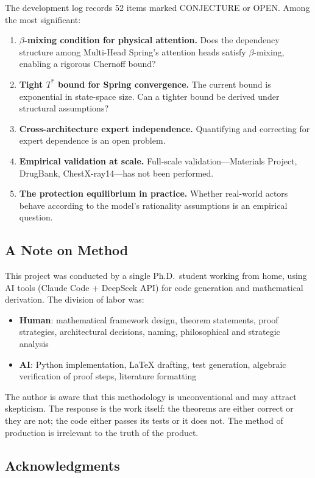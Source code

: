 \documentclass[12pt,a4paper]{ctexart}
\begin{document}
The development log records 52 items marked CONJECTURE or OPEN. Among the most significant:
\begin{enumerate}
\item \textbf{$\beta$-mixing condition for physical attention.} Does the dependency structure among Multi-Head Spring's attention heads satisfy $\beta$-mixing, enabling a rigorous Chernoff bound?
\item \textbf{Tight $T^*$ bound for Spring convergence.} The current bound is exponential in state-space size. Can a tighter bound be derived under structural assumptions?
\item \textbf{Cross-architecture expert independence.} Quantifying and correcting for expert dependence is an open problem.
\item \textbf{Empirical validation at scale.} Full-scale validation—Materials Project, DrugBank, ChestX-ray14—has not been performed.
\item \textbf{The protection equilibrium in practice.} Whether real-world actors behave according to the model's rationality assumptions is an empirical question.
\end{enumerate}

\subsection*{A Note on Method}

This project was conducted by a single Ph.D.\ student working from home, using AI tools (Claude Code + DeepSeek API) for code generation and mathematical derivation. The division of labor was:
\begin{itemize}
\item \textbf{Human}: mathematical framework design, theorem statements, proof strategies, architectural decisions, naming, philosophical and strategic analysis
\item \textbf{AI}: Python implementation, LaTeX drafting, test generation, algebraic verification of proof steps, literature formatting
\end{itemize}

The author is aware that this methodology is unconventional and may attract skepticism. The response is the work itself: the theorems are either correct or they are not; the code either passes its tests or it does not. The method of production is irrelevant to the truth of the product.

\subsection*{Acknowledgments}
\end{document}
